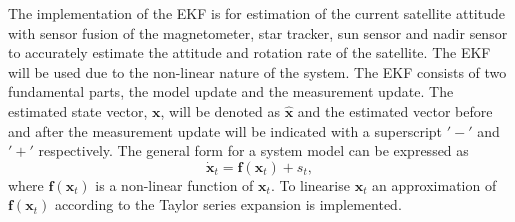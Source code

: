%	
%	
%	
%	
%	
%	

The implementation of the EKF is for estimation of the current satellite attitude with sensor fusion of the magnetometer, star tracker, sun sensor and nadir sensor to accurately estimate the attitude and rotation rate of the satellite. The EKF will be used due to the non-linear nature of the system. The EKF consists of two fundamental parts, the model update and the measurement update. The estimated state vector, $\mathbf{x}$, will be denoted as $\hat{\mathbf{x}}$ and the estimated vector before and after the measurement update will be indicated with a superscript $'-'$ and $'+'$ respectively. The general form for a system model can be expressed as
\begin{equation}
	\mathbf{\dot{x}}_t = \mathbf{f}(\mathbf{x}_t) + s_t,
\end{equation}
where $\mathbf{f}(\mathbf{x}_t)$ is a non-linear function of $\mathbf{x}_t$. To linearise $\mathbf{x}_t$ an approximation of $\mathbf{f}(\mathbf{x}_t)$ according to the Taylor series expansion is implemented.

